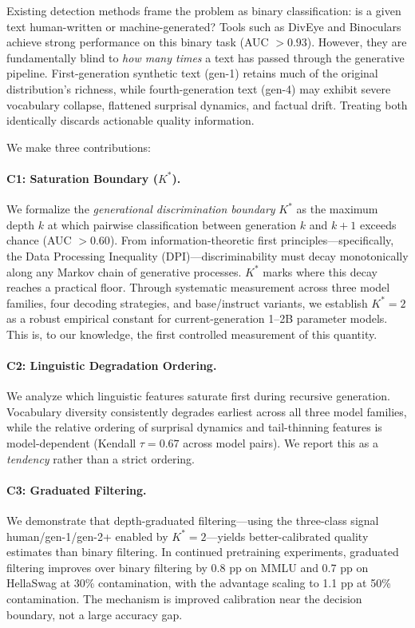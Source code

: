 \documentclass[11pt,a4paper]{article}
\begin{document}
Existing detection methods frame the problem as binary classification: is a given text human-written or machine-generated? Tools such as DivEye and Binoculars achieve strong performance on this binary task (AUC $>0.93$). However, they are fundamentally blind to \emph{how many times} a text has passed through the generative pipeline. First-generation synthetic text (gen-1) retains much of the original distribution's richness, while fourth-generation text (gen-4) may exhibit severe vocabulary collapse, flattened surprisal dynamics, and factual drift. Treating both identically discards actionable quality information.

We make three contributions:

\paragraph{C1: Saturation Boundary ($K^*$).} We formalize the \emph{generational discrimination boundary} $K^*$ as the maximum depth $k$ at which pairwise classification between generation $k$ and $k+1$ exceeds chance (AUC $>0.60$). From information-theoretic first principles---specifically, the Data Processing Inequality (DPI)---discriminability must decay monotonically along any Markov chain of generative processes. $K^*$ marks where this decay reaches a practical floor. Through systematic measurement across three model families, four decoding strategies, and base/instruct variants, we establish $K^*=2$ as a robust empirical constant for current-generation 1--2B parameter models. This is, to our knowledge, the first controlled measurement of this quantity.

\paragraph{C2: Linguistic Degradation Ordering.} We analyze which linguistic features saturate first during recursive generation. Vocabulary diversity consistently degrades earliest across all three model families, while the relative ordering of surprisal dynamics and tail-thinning features is model-dependent (Kendall $\tau = 0.67$ across model pairs). We report this as a \emph{tendency} rather than a strict ordering.

\paragraph{C3: Graduated Filtering.} We demonstrate that depth-graduated filtering---using the three-class signal human/gen-1/gen-2+ enabled by $K^*=2$---yields better-calibrated quality estimates than binary filtering. In continued pretraining experiments, graduated filtering improves over binary filtering by 0.8 pp on MMLU and 0.7 pp on HellaSwag at 30\% contamination, with the advantage scaling to 1.1 pp at 50\% contamination. The mechanism is improved calibration near the decision boundary, not a large accuracy gap.
\end{document}
